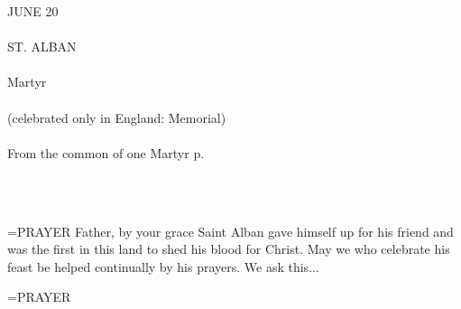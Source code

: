 \begin{center}\normalsize \begin{center}\normalsize JUNE 20\\\\
\footnotesize \footnotesize ST. ALBAN\\\\
\footnotesize \footnotesize Martyr\\\\
\footnotesize \footnotesize (celebrated only in England: Memorial)\\\\
\footnotesize \footnotesize From the common of one Martyr p. \\\\
\footnotesize \end{center}\\
\end{center}

\hangindent=\parindent \small{PRAYER 
Father, by your grace Saint Alban gave himself up for his friend
and was the first in this land to shed his blood for Christ. May we
who celebrate his feast be helped continually by his prayers. We ask
this...\\}
 
\hangindent=\parindent \small{PRAYER \\}
 
